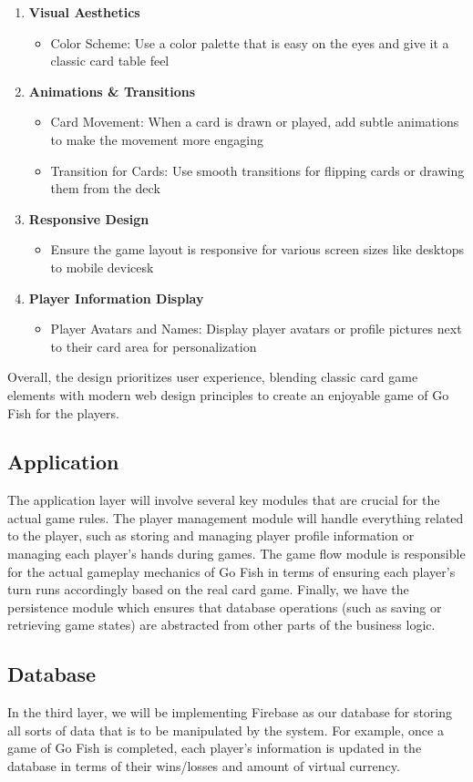 \begin{enumerate}
    \item\textbf{Visual Aesthetics}
    \begin{itemize}
        \item Color Scheme: Use a color palette that is easy on the eyes and give it a classic card table feel
    \end{itemize}

    \item\textbf{Animations \& Transitions}
    \begin{itemize}
        \item Card Movement: When a card is drawn or played, add subtle animations to make the movement more engaging
        \item Transition for Cards: Use smooth transitions for flipping cards or drawing them from the deck
    \end{itemize}

    \item\textbf{Responsive Design}
    \begin{itemize}
        \item Ensure the game layout is responsive for various screen sizes like desktops to mobile devicesk
    \end{itemize}
    \pagebreak

    \item\textbf{Player Information Display}
    \begin{itemize}
        \item Player Avatars and Names: Display player avatars or profile pictures next to their card area for personalization
    \end{itemize}
\end{enumerate}

Overall, the design prioritizes user experience, blending classic card game elements with modern web design principles to create an  enjoyable game of Go Fish for the players.

\subsection{Application}
The application layer will involve several key modules that are crucial for the actual game rules. The player management module will handle everything related to the player, such as storing and managing player profile information or managing each player’s hands during games. The game flow module is responsible for the actual gameplay mechanics of Go Fish in terms of ensuring each player’s turn runs accordingly based on the real card game. Finally, we have the persistence module which ensures that database operations (such as saving or retrieving game states) are abstracted from other parts of the business logic. 

\subsection{Database}
In the third layer, we will be implementing Firebase as our database for storing all sorts of data that is to be manipulated by the system. For example, once a game of Go Fish is completed, each player’s information is updated in the database in terms of their wins/losses and amount of virtual currency.